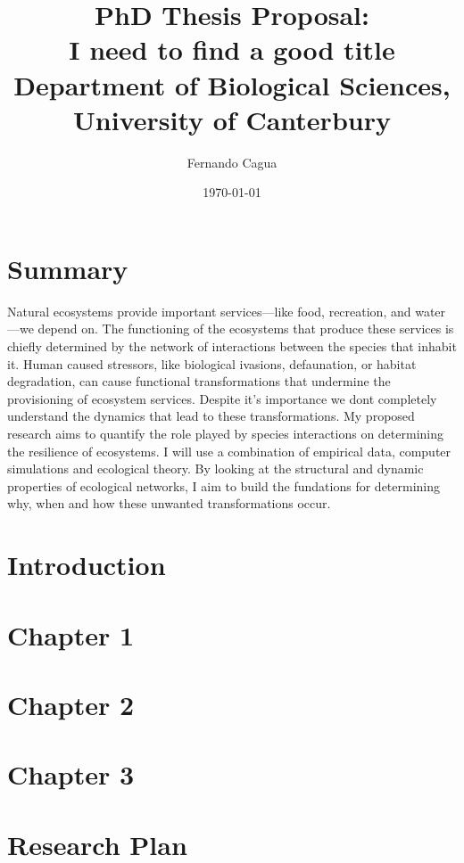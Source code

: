 \documentclass[a4paper]{report}
\title{
	{\large PhD Thesis Proposal:} \\
	{\Large \textbf{I need to find a good title}} \\
	{\large Department of Biological Sciences, University of Canterbury}
}
\author{
  {\Large Fernando Cagua} \\
}
\date{\normalsize \today}
\begin{document}
\maketitle

\chapter*{Summary}

Natural ecosystems provide important services---like food, recreation, and water---we depend on. 
The functioning of the ecosystems that produce these services is chiefly determined by the network of interactions between the species that inhabit it. 
Human caused stressors, like biological ivasions, defaunation, or habitat degradation, can cause functional transformations that undermine the provisioning of ecosystem services. 
Despite it's importance we dont completely understand the dynamics that lead to these transformations.
My proposed research aims to quantify the role played by species interactions on determining the resilience of ecosystems.
I will use a combination of empirical data, computer simulations and ecological theory. 
By looking at the structural and dynamic properties of ecological networks, I aim to build the fundations for determining why, when and how these unwanted transformations occur. 

\chapter*{Introduction}

\chapter*{Chapter 1}
\chapter*{Chapter 2}
\chapter*{Chapter 3}

\chapter*{Research Plan}
\end{document}
